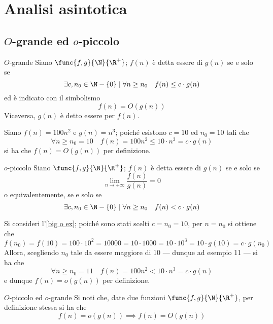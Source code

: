 \documentclass[a4paper, 12pt]{report}
\begin{document}
    \section{Analisi asintotica}
    
    \subsection{$O$-grande ed $o$-piccolo}

    \begin{frameddefn}{$O$-grande}
        Siano $\func{f, g}{\N}{\R^+}$; $f(n)$ è detta essere  di $g(n)$ se e solo se $$\exists c, n_0 \in \N - \{0\} \mid \forall n \ge n_0 \quad f(n) \leq c \cdot g(n)$$ ed è indicato con il simbolismo $$f(n) = O(g(n))$$ Viceversa, $g(n)$ è detto essere  per $f(n)$.
    \end{frameddefn}

    \begin{example}[$O$-grande]
        \label{big o ex}
        Siano $f(n) = 100 n^2$ e $g(n) = n^3$; poiché esistono $c = 10$ ed $n_0 = 10$ tali che $$\forall n \ge n_0 = 10 \quad f(n) = 100 n^2 \leq 10 \cdot n^3 = c \cdot g(n)$$ si ha che $f(n) = O(g(n))$ per definizione.
    \end{example}

    \begin{frameddefn}{$o$-piccolo}
        Siano $\func{f, g}{\N}{\R^+}$; $f(n)$ è detta essere  di $g(n)$ se e solo se $$\lim_{n \to + \infty}{\dfrac{f(n)}{g(n)}} = 0$$ o equivalentemente, se e solo se $$\exists c, n_0 \in \N - \{0\} \mid \forall n \ge n_0 \quad f(n) < c \cdot g(n)$$
    \end{frameddefn}

    \begin{example}[$o$-piccolo]
        Si consideri l'\cref{big o ex}; poiché sono stati scelti $c = n_0 = 10$, per $n = n_0$ si ottiene che $$f(n_0) = f(10) = 100 \cdot 10^2 = 10000 = 10 \cdot 1000 = 10 \cdot 10^3 = 10 \cdot g(10) = c \cdot g(n_0)$$ Allora, scegliendo $n_0$ tale da essere maggiore di 10 --- dunque ad esempio 11 --- si ha che $$\forall n \ge n_0 = 11 \quad f(n) = 100 n^2 < 10 \cdot n^3 = c \cdot g(n)$$ e dunque $f(n) = o(g(n))$ per definizione.
    \end{example}

    \begin{framedobs}[label={small o big o obs}]{$O$-piccolo ed $o$-grande}
        Si noti che, date due funzioni $\func{f,g}{\N}{\R^+}$, per definizione stessa si ha che $$f(n) = o(g(n)) \implies f(n)= O(g(n))$$
    \end{framedobs}
\end{document}
